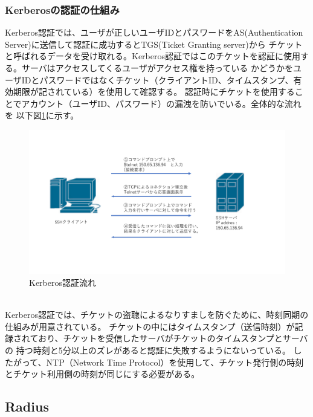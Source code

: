 \documentclass[12pt,a4paper,titlepage]{jsarticle}
\begin{document}
\subsubsection*{Kerberosの認証の仕組み}
Kerberos認証では、ユーザが正しいユーザIDとパスワードをAS(Authentication Server)に送信して認証に成功するとTGS(Ticket Granting server)から
チケットと呼ばれるデータを受け取れる。Kerberos認証ではこのチケットを認証に使用する。サーバはアクセスしてくるユーザがアクセス権を持っている
かどうかをユーザIDとパスワードではなくチケット（クライアントID、タイムスタンプ、有効期限が記されている）を使用して確認する。
認証時にチケットを使用することでアカウント（ユーザID、パスワード）の漏洩を防いでいる。全体的な流れを
以下図\ref{KerberosAuthority}に示す。
\begin{figure}[h]
    \begin{flushleft}
        \includegraphics[width=1.0\textwidth, page=12]{graphs/network_archtecture.pdf}
        \caption{Kerberos認証流れ}
        \label{KerberosAuthority}
    \end{flushleft}
\end{figure}\\
Kerberos認証では、チケットの盗聴によるなりすましを防ぐために、時刻同期の仕組みが用意されている。
チケットの中にはタイムスタンプ（送信時刻）が記録されており、チケットを受信したサーバがチケットのタイムスタンプとサーバの
持つ時刻と5分以上のズレがあると認証に失敗するようにないっている。
したがって、NTP（Network Time Protocol）を使用して、チケット発行側の時刻とチケット利用側の時刻が同じにする必要がある。


\subsection{Radius}
\end{document}
